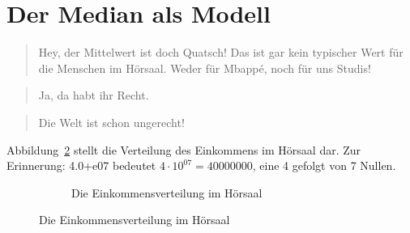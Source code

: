 \documentclass[
  letterpaper,
  twoside,
  open=any]{scrbook}
\theoremstyle{definition}
\theoremstyle{definition}
\theoremstyle{definition}
\theoremstyle{remark}
\begin{document}
\section{Der Median als Modell}\label{sec-median}

\begin{quote}
{} Hey, der Mittelwert ist doch Quatsch! Das ist gar kein
typischer Wert für die Menschen im Hörsaal. Weder für Mbappé, noch für
uns Studis!
\end{quote}

\begin{quote}
{} Ja, da habt ihr Recht.
\end{quote}

\begin{quote}
{} Die Welt ist schon ungerecht!
\end{quote}

Abbildung~\ref{fig-mbappe} stellt die Verteilung des Einkommens im
Hörsaal dar. Zur Erinnerung: 4.0+e07 bedeutet
\(4 \cdot 10^{07} = 40000000\), eine 4 gefolgt von 7 Nullen.

\begin{figure}

\begin{minipage}{\linewidth}

\begin{figure}[H]


\caption{\label{fig-mbappe}Die Einkommensverteilung im Hörsaal}

\end{figure}%

\end{minipage}%

\end{figure}%
\end{document}
